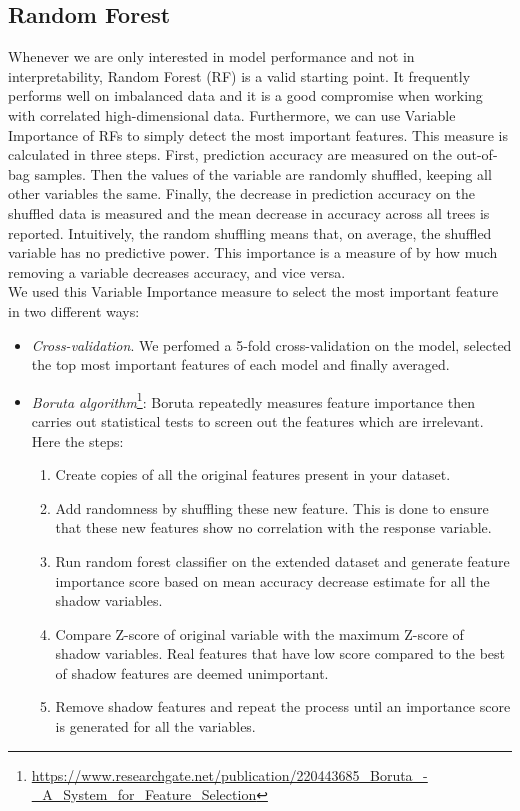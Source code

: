 \documentclass[a4paper,11pt, oneside]{article}  %
\begin{document}
\subsection{Random Forest}
Whenever we are only interested in model performance and not in interpretability, Random Forest (RF) is a valid starting point. It frequently performs well on imbalanced data and it is a good compromise when working with correlated high-dimensional data. Furthermore, we can use Variable Importance of RFs to simply detect the most important features. This measure is calculated in three steps. First, prediction accuracy are measured on the out-of-bag samples. Then the values of the variable are randomly shuffled, keeping all other variables the same. Finally, the decrease in prediction accuracy on the shuffled data is measured and the mean decrease in accuracy across all trees is reported. Intuitively, the random shuffling means that, on average, the shuffled variable has no predictive power. This importance is a measure of by how much removing a variable decreases accuracy, and vice versa. \\
We used this Variable Importance measure to select the most important feature in two different ways:

\begin{itemize}
	\item \textit{Cross-validation}. We perfomed a 5-fold cross-validation on the model, selected the top most important features of each model and finally averaged.
	\item \textit{Boruta algorithm}\footnote{\url{https://www.researchgate.net/publication/220443685_Boruta_-_A_System_for_Feature_Selection}}: Boruta repeatedly measures feature importance then carries out statistical tests to screen out the features which are irrelevant. Here the steps:
	\begin{enumerate}
	\item Create copies of all the original features present in your dataset.
	\item Add randomness by shuffling these new feature. This is done to ensure that these new features show no correlation with the response variable.
	\item Run random forest classifier on the extended dataset and generate feature importance score based on mean accuracy decrease estimate for all the shadow variables.
	\item Compare Z-score of original variable with the maximum Z-score of shadow variables. Real features that have low score compared to the best of shadow features are deemed unimportant.
	\item Remove shadow features and repeat the process until an importance score is generated for all the variables.
	\end{enumerate}
\end{itemize}
\end{document}
